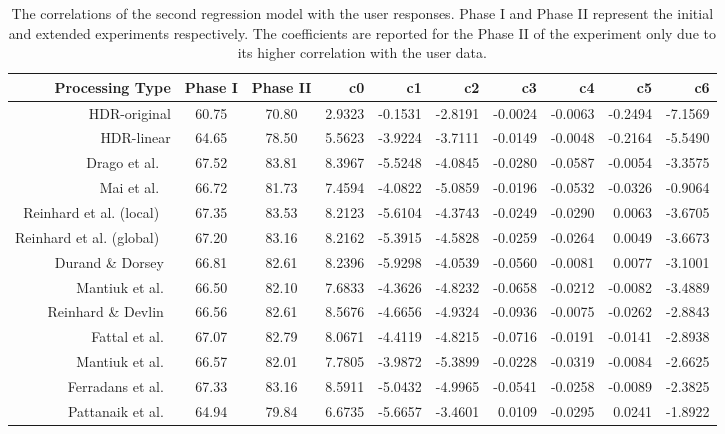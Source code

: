 \begin{sidewaystable}
\caption{The correlations of the second regression model with the user responses. Phase I and Phase II represent the initial and extended experiments respectively. The coefficients are reported for the Phase II of the experiment only due to its higher correlation with the user data.}
\centering
\begin{tabular}{r|c c || r r r r r r r}
\label{tab:correlation_duplet_model}
\textbf{Processing Type} & \textbf{Phase I} & \textbf{Phase II} & \textbf{c0} & \textbf{c1} & \textbf{c2} & \textbf{c3} & 
\textbf{c4} & \textbf{c5} & \textbf{c6}\\
\hline
HDR-original & 60.75 & 70.80 & 2.9323 & -0.1531 & -2.8191 & -0.0024 & -0.0063 & -0.2494 & -7.1569 \\
HDR-linear & 64.65 & 78.50 & 5.5623 & -3.9224 & -3.7111 & -0.0149 & -0.0048 & -0.2164 & -5.5490 \\
Drago et al. ~\cite{drago2003adaptive} & 67.52 & 83.81 & 8.3967 & -5.5248 & -4.0845 & -0.0280 & -0.0587 & -0.0054 & -3.3575 \\
Mai et al. ~\cite{mai2011subjective} & 66.72 & 81.73 & 7.4594 & -4.0822 & -5.0859 & -0.0196 & -0.0532 & -0.0326 & -0.9064 \\
Reinhard et al. (local) ~\cite{reinhard2002photographic} & 67.35 & 83.53 & 8.2123 & -5.6104 & -4.3743 & -0.0249 & -0.0290 & 0.0063 & -3.6705 \\
Reinhard et al. (global) ~\cite{reinhard2002photographic} & 67.20 & 83.16 & 8.2162 & -5.3915 & -4.5828 & -0.0259 & -0.0264 & 0.0049 & -3.6673 \\
Durand \& Dorsey~\cite{durand2002fast} & 66.81 & 82.61 & 8.2396 & -5.9298 & -4.0539 & -0.0560 & -0.0081 & 0.0077 & -3.1001 \\
Mantiuk et al.~\cite{mantiuk2006backward} & 66.50 & 82.10 & 7.6833 & -4.3626 & -4.8232 & -0.0658 & -0.0212 & -0.0082 & -3.4889 \\
Reinhard \& Devlin~\cite{reinhard2005dynamic} & 66.56 & 82.61 & 8.5676 & -4.6656 & -4.9324 & -0.0936 & -0.0075 & -0.0262 & -2.8843 \\
Fattal et al.~\cite{durand2002fast} & 67.07 & 82.79 & 8.0671 & -4.4119 & -4.8215 & -0.0716 & -0.0191 & -0.0141 & -2.8938 \\
Mantiuk et al.~\cite{mantiuk2008modeling} & 66.57 & 82.01 & 7.7805 & -3.9872 & -5.3899 & -0.0228 & -0.0319 & -0.0084 & -2.6625 \\
Ferradans et al.~\cite{ferradans2011analysis} & 67.33 & 83.16 & 8.5911 & -5.0432 & -4.9965 & -0.0541 & -0.0258 & -0.0089 & -2.3825 \\
Pattanaik et al.~\cite{pattanaik2000time} & 64.94 & 79.84 & 6.6735 & -5.6657 & -3.4601 & 0.0109 & -0.0295 & 0.0241 & -1.8922
\end{tabular}
\end{sidewaystable}
